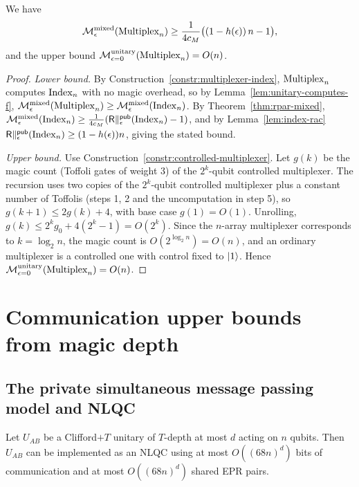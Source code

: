 \begin{lemma}
  \label{lem:multiplex-bound}
  We have
  \[
    \mathcal{M}^{\mathrm{mixed}}_\epsilon(\mathrm{Multiplex}_n) \ge \frac{1}{4c_M}\big((1-h(\epsilon))\,n - 1
      \big),
  \]
  and the upper bound $\mathcal{M}^{\mathrm{unitary}}_{\epsilon=0}(\mathrm{Multiplex}_n) = O(n)$.
\end{lemma}
\begin{proof}
  \emph{Lower bound.} By Construction~\ref{constr:multiplexer-index},
  $\mathrm{Multiplex}_n$ computes $\mathrm{Index}_n$ with no magic overhead, so by
  Lemma~\ref{lem:unitary-computes-f}, $\mathcal{M}^{\mathrm{mixed}}_\epsilon(\mathrm{Multiplex}_n) \ge
  \mathcal{M}^{\mathrm{mixed}}_\epsilon(\mathrm{Index}_n)$. By Theorem~\ref{thm:rpar-mixed},
  $\mathcal{M}^{\mathrm{mixed}}_\epsilon(\mathrm{Index}_n) \ge \tfrac{1}{4c_M}(\mathsf{R}\|^{\mathsf{pub}}_\epsilon(\mathrm{Index}_n) - 1)$,
  and by Lemma~\ref{lem:index-rac} $\mathsf{R}\|^{\mathsf{pub}}_\epsilon(\mathrm{Index}_n) \ge
  (1-h(\epsilon))n$, giving the stated bound.

  \emph{Upper bound.} Use Construction~\ref{constr:controlled-multiplexer}. Let
  $g(k)$ be the magic count (Toffoli gates of weight $3$) of the $2^k$-qubit
  controlled multiplexer. The recursion uses two copies of the $2^k$-qubit
  controlled multiplexer plus a constant number of Toffolis (steps 1, 2 and the
  uncomputation in step 5), so $g(k+1) \le 2g(k) + 4$, with base case $g(1) =
  O(1)$. Unrolling, $g(k) \le 2^k g_0 + 4(2^k - 1) = O(2^k)$. Since the
  $n$-array multiplexer corresponds to $k = \log_2 n$, the magic count is
  $O(2^{\log_2 n}) = O(n)$, and an ordinary multiplexer is a controlled one with
  control fixed to $\lvert 1\rangle$. Hence $\mathcal{M}^{\mathrm{unitary}}_{\epsilon=0}(\mathrm{Multiplex}_n) = O(n)$.
\end{proof}

\chapter{Communication upper bounds from magic depth}

\section{The private simultaneous message passing model and NLQC}

\begin{theorem}
  \label{thm:speelman-nlqc}
  \notready
  Let $U_{AB}$ be a Clifford$+T$ unitary of $T$-depth at most $d$ acting on $n$
  qubits. Then $U_{AB}$ can be implemented as an NLQC using at most $O((68n)^d)$
  bits of communication and at most $O((68n)^d)$ shared EPR pairs.
\end{theorem}

